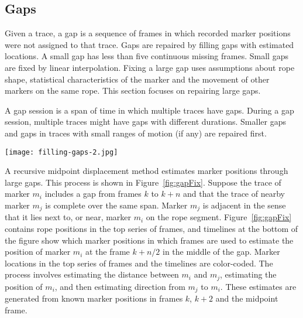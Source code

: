 \subsection{Gaps}
\label{sec:Gaps}

Given a trace, a gap is a sequence of frames in which recorded marker positions were not assigned to that trace.  Gaps are repaired by filling gaps with estimated locations. A small gap has less than five continuous missing frames. Small gaps are fixed by linear interpolation. Fixing a large gap uses assumptions about rope shape, statistical characteristics of the marker and the movement of other markers on the same rope.  This section focuses on repairing large gaps.

A gap session is a span of time in which multiple traces have gaps. During a gap session, multiple traces might have gaps with different durations. Smaller gaps and gaps in traces with small ranges of motion (if any) are repaired first.

\begin{figure*}[tb]
\center
\texttt{[image: filling-gaps-2.jpg]}
\caption[Estimate the position of marker.]{Estimating the position of marker $m_i$ in the center frame of a long gap using the positions of markers $m_j$, $m_j1$, and $m_j2$.}
\label{fig:gapFix} 
\end{figure*}

A recursive midpoint displacement method estimates marker positions through large gaps. This process is shown in Figure~\ref{fig:gapFix}. Suppose the trace of marker $m_i$ includes a gap from frames $k$ to $k+n$ and that the trace of nearby marker $m_j$ is complete over the same span.  Marker $m_j$ is adjacent in the sense that it lies next to, or near, marker $m_i$ on the rope segment.  Figure~\ref{fig:gapFix} contains rope positions in the top series of frames, and timelines at the bottom of the figure show which marker positions in which frames are used to estimate the position of marker $m_i$ at the frame $k+n/2$ in the middle of the gap.  Marker locations in the top series of frames and the timelines are color-coded.  The process involves estimating the distance between $m_i$ and $m_j$, estimating the position of $m_i$, and then estimating direction from $m_j$ to $m_i$.  These estimates are generated from known marker positions in frames $k$, $k+2$ and the midpoint frame.  

